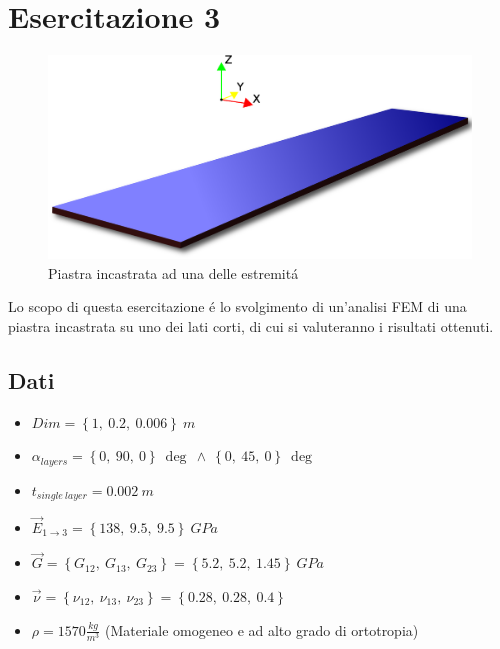 \documentclass{article}
\begin{document}
        \section{Esercitazione 3 \label{Esercitazione_3}}

            \begin{figure}[h!]
                \includegraphics[width=\textwidth]{MUL2/Esercitazione3/plank.eps}
                \caption{Piastra incastrata ad una delle estremitá}
            \end{figure}

        Lo scopo di questa esercitazione é lo svolgimento di un'analisi FEM di una piastra incastrata su uno 
        dei lati corti, di cui si valuteranno i risultati ottenuti.

            \subsection{Dati\label{Esercitazione3_dati}}

            \begin{itemize}
                \item $Dim = \left\{1, \ 0.2, \ 0.006 \right\} \ m $
                \item $\alpha_{layers} = \left\{0, \ 90, \ 0 \right\} \ \deg \  \wedge \  \left\{0, \ 45, \ 0 \right\} \ \deg$
                \item $t_{single \ layer} = 0.002 \ m$
                \item $\vec{E}_{1\rightarrow 3} = \left\{138, \ 9.5, \ 9.5\right\} \ GPa $
                \item $\vec{G} = \left\{G_{12}, \ G_{13}, \ G_{23}\right\} = \left\{5.2, \ 5.2, \ 1.45\right\} \ GPa$
                \item $\vec{\nu } = \left\{\nu_{12}, \ \nu_{13}, \ \nu_{23}\right\} = \left\{0.28, \ 0.28, \ 0.4\right\}$
                \item $\rho = 1570 \frac{kg}{m^3}$ (Materiale omogeneo e ad alto grado di ortotropia)
            \end{itemize}
\end{document}
